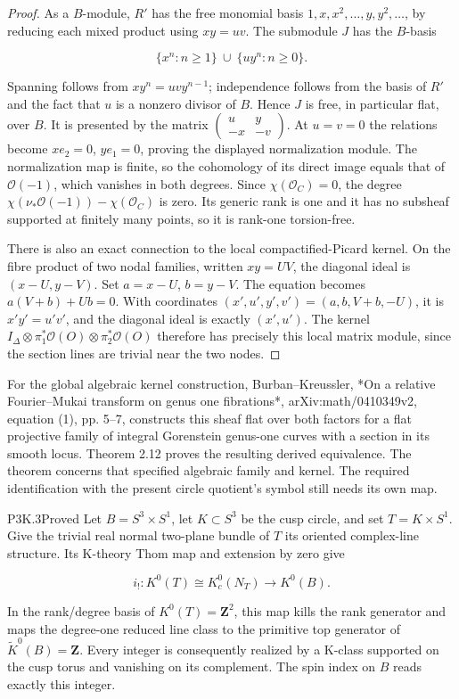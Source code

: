 \begin{proof}
As a \(B\)-module, \(R'\) has the free monomial basis
\(1,x,x^2,\ldots,y,y^2,\ldots\), by reducing each mixed product using
\(xy=uv\).  The submodule \(J\) has the \(B\)-basis

\[
 \{x^n:n\geq1\}\ \cup\ \{u y^n:n\geq0\}.
\]

Spanning follows from \(xy^n=uvy^{n-1}\); independence follows from
the basis of \(R'\) and the fact that \(u\) is a nonzero divisor of
\(B\).  Hence \(J\) is free, in particular flat, over \(B\).
It is presented by the matrix
\(\left(\begin{smallmatrix}u&y\\-x&-v\end{smallmatrix}\right)\).
At \(u=v=0\) the relations become \(x e_2=0\), \(y e_1=0\), proving
the displayed normalization module.  The normalization map is finite,
so the cohomology of its direct image equals that of \(\mathcal O(-1)\),
which vanishes in both degrees.  Since \(\chi(\mathcal O_C)=0\), the
degree \(\chi(\nu_*\mathcal O(-1))-\chi(\mathcal O_C)\) is zero.
Its generic rank is one and it has no subsheaf supported at finitely
many points, so it is rank-one torsion-free.

There is also an exact connection to the local compactified-Picard
kernel.  On the fibre product of two nodal families, written
\(xy=UV\), the diagonal ideal is \((x-U,y-V)\).  Set
\(a=x-U\), \(b=y-V\).  The equation becomes
\(a(V+b)+Ub=0\).  With coordinates
\((x',u',y',v')=(a,b,V+b,-U)\), it is
\(x'y'=u'v'\), and the diagonal ideal is exactly \((x',u')\).
The kernel
\(I_\Delta\otimes\pi_1^*\mathcal O(O)\otimes\pi_2^*\mathcal O(O)\)
therefore has precisely this local matrix module, since the section
lines are trivial near the two nodes.
\end{proof}

For the global algebraic kernel construction, Burban–Kreussler,
*On a relative Fourier–Mukai transform on genus one fibrations*,
arXiv:math/0410349v2, equation (1), pp. 5–7, constructs this sheaf flat
over both factors for a flat projective family of integral Gorenstein
genus-one curves with a section in its smooth locus.  Theorem 2.12
proves the resulting derived equivalence.  The theorem concerns that
specified algebraic family and kernel.  The required identification
with the present circle quotient's symbol still needs its own map.

\begin{statement}{P3K.3}{Proved}
Let \(B=S^3\times S^1\), let \(K\subset S^3\) be the cusp circle,
and set \(T=K\times S^1\).  Give the trivial real normal two-plane
bundle of \(T\) its oriented complex-line structure.  Its K-theory
Thom map and extension by zero give

\[
 i_!:K^0(T)\cong K^0_c(N_T)\longrightarrow K^0(B).
\]

In the rank/degree basis of \(K^0(T)=\mathbf Z^2\), this map kills
the rank generator and maps the degree-one reduced line class to the
primitive top generator of \(\widetilde K^0(B)=\mathbf Z\).  Every
integer is consequently realized by a K-class supported on the cusp
torus and vanishing on its complement.  The spin index on \(B\)
reads exactly this integer.
\end{statement}


